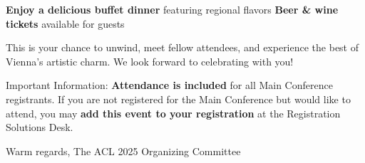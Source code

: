 \textbf{Enjoy a delicious buffet dinner} featuring regional flavors
\textbf{Beer & wine tickets} available for guests

This is your chance to unwind, meet fellow attendees, and experience the best of Vienna’s artistic charm. We look forward to celebrating with you!

Important Information:
\textbf{Attendance is included} for all Main Conference registrants.
If you are not registered for the Main Conference but would like to attend, you may \textbf{add this event to your registration} at the Registration Solutions Desk.

Warm regards,
The ACL 2025 Organizing Committee
